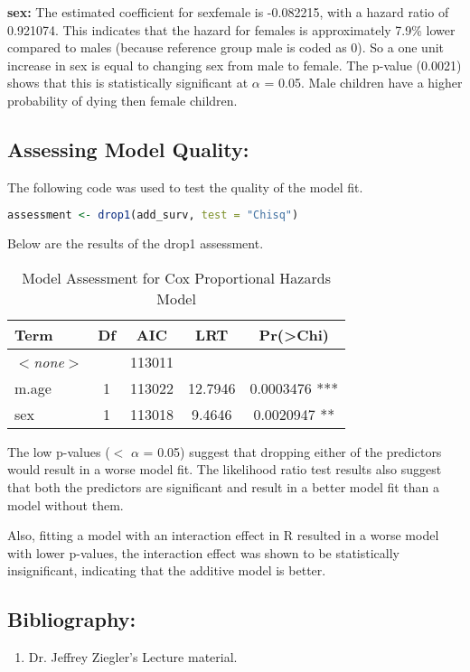 \documentclass[12pt,letterpaper]{article}
\begin{document}
\vspace{1cm}

\textbf{sex:} The estimated coefficient for sexfemale is -0.082215, with a hazard ratio of 0.921074. This indicates that the hazard for females is approximately 7.9\% lower compared to males (because reference group male is coded as 0). So a one unit increase in sex is equal to changing sex from male to female. The p-value (0.0021) shows that this is statistically significant at $\alpha$ = 0.05. Male children have a higher probability of dying then female children.

\vspace{2cm}

\subsection*{Assessing Model Quality:}

The following code was used to test the quality of the model fit.

\begin{lstlisting}[language = R]
	assessment <- drop1(add_surv, test = "Chisq")
\end{lstlisting}

Below are the results of the drop1 assessment.

\begin{table}[ht]
	\centering
	\caption{Model Assessment for Cox Proportional Hazards Model}
	\label{tab:model_assessment}
	\begin{tabular}{lcccc}
		\toprule
		Term & Df & AIC & LRT & Pr(>Chi) \\ 
		\midrule
		\textit{$<$none$>$} &  & 113011 &  &  \\
		m.age & 1 & 113022 & 12.7946 & 0.0003476 *** \\
		sex & 1 & 113018 & 9.4646 & 0.0020947 ** \\
		\bottomrule
	\end{tabular}
\end{table}

The low p-values ($<$ $\alpha$ = 0.05) suggest that dropping either of the predictors would result in a worse model fit. The likelihood ratio test results also suggest that both the predictors are significant and result in a better model fit than a model without them.

Also, fitting a model with an interaction effect in R resulted in a worse model with lower p-values, the interaction effect was shown to be statistically insignificant, indicating that the additive model is better.

\subsection*{Bibliography:}

\begin{enumerate}
	\item Dr. Jeffrey Ziegler's Lecture material.
\end{enumerate}
\end{document}
